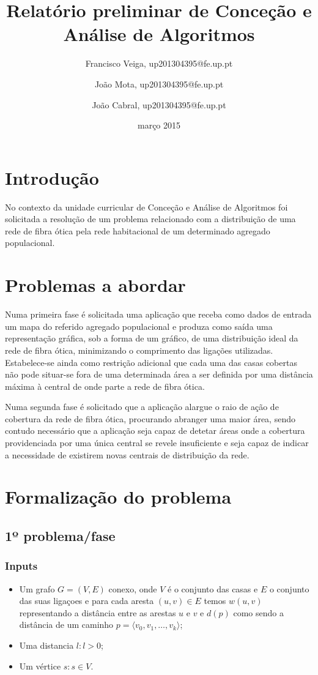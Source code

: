 \documentclass[a4paper,12pt,titlepage]{article}
\begin{document}
\title{Relatório preliminar de Conceção e Análise de Algoritmos}
\date{março 2015}
\author{Francisco Veiga, up201304395@fe.up.pt
 \and João Mota, up201304395@fe.up.pt
 \and João Cabral, up201304395@fe.up.pt}
\maketitle

\section*{Introdução}

No contexto da unidade curricular de Conceção e Análise de Algoritmos foi solicitada a resolução de um problema relacionado com a distribuição de uma rede de fibra ótica pela rede habitacional de um determinado agregado populacional.

\section*{Problemas a abordar} 
Numa primeira fase é solicitada uma aplicação que receba como dados de entrada um mapa do referido agregado populacional e produza como saída uma representação gráfica, sob a forma de um gráfico, de uma distribuição ideal da rede de fibra ótica, minimizando o comprimento das ligações utilizadas. Estabelece-se ainda como restrição adicional que cada uma das casas cobertas não pode situar-se fora de uma determinada área a ser definida por uma distância máxima à central de onde parte a rede de fibra ótica.
 
Numa segunda fase é solicitado que a aplicação alargue o raio de ação de cobertura da rede de fibra ótica, procurando abranger uma maior área, sendo contudo necessário que a aplicação seja capaz de detetar áreas onde a cobertura providenciada por uma única central se revele insuficiente e seja capaz de indicar a necessidade de existirem novas centrais de distribuição da rede.

\newpage
\section*{Formalização do problema}

\subsection*{1º problema/fase}
\subsubsection*{Inputs}
\begin{itemize}
\item Um grafo  $G= ( V, E ) $ conexo, onde $V$ é o conjunto das casas e $E$ o conjunto das suas ligaçoes e para cada aresta $(u,v)\in E$ temos $w(u,v)$ representando a distância entre as arestas $u$ e $v$ e $d(p)$ como sendo a distância de um caminho $p = \langle v_0,v_1,\ldots , v_k\rangle$;
\item Uma distancia $l:l > 0$;
\item Um vértice $s:s\in V$.
\end{itemize}
\end{document}
